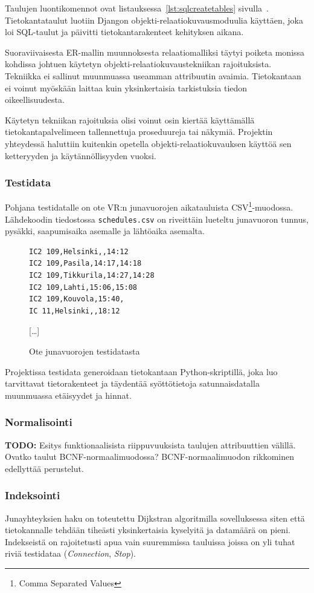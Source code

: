 \documentclass[a4paper,twoside,titlepage,12pt]{article}
\begin{document}
Taulujen luontikomennot ovat listauksessa~\ref{lst:sqlcreatetables} sivulla~\pageref{lst:sqlcreatetables}. Tietokantataulut luotiin Djangon objekti-relaatiokuvausmoduulia käyttäen, joka loi SQL-taulut ja päivitti tietokantarakenteet kehityksen aikana.

Suoraviivaisesta ER-mallin muunnoksesta relaatiomalliksi täytyi poiketa monissa kohdissa johtuen käytetyn objekti-relaatiokuvaustekniikan rajoituksista. Tekniikka ei sallinut muunmuassa useamman attribuutin avaimia. Tietokantaan ei voinut myöskään laittaa kuin yksinkertaisia tarkistuksia tiedon oikeellisuudesta.

Käytetyn tekniikan rajoituksia olisi voinut osin kiertää käyttämällä tietokantapalvelimeen tallennettuja proseduureja tai näkymiä. Projektin yhteydessä haluttiin kuitenkin opetella objekti-relaatiokuvauksen käyttöä sen ketteryyden ja käytännöllisyyden vuoksi.

\subsubsection{Testidata}

Pohjana testidatalle on ote VR:n junavuorojen aikatauluista CSV\footnote{Comma Separated Values}-muodossa. Lähdekoodin tiedostossa \texttt{schedules.csv} on riveittäin lueteltu junavuoron tunnus, pysäkki, saapumisaika asemalle ja lähtöaika asemalta.

\begin{figure}
\begin{lstlisting}
IC2 109,Helsinki,,14:12
IC2 109,Pasila,14:17,14:18
IC2 109,Tikkurila,14:27,14:28
IC2 109,Lahti,15:06,15:08
IC2 109,Kouvola,15:40,
IC 11,Helsinki,,18:12
\end{lstlisting}
[\ldots]
  \caption{Ote junavuorojen testidatasta}
\end{figure}

Projektissa testidata generoidaan tietokantaan Python-skriptillä, joka luo tarvittavat tietorakenteet ja täydentää syöttötietoja satunnaisdatalla muunmuassa etäisyydet ja hinnat.

\subsubsection{Normalisointi}
\textbf{TODO:} Esitys funktionaalisista riippuvuuksista taulujen attribuuttien välillä. Ovatko taulut BCNF-normaalimuodossa? BCNF-normaalimuodon rikkominen edellyttää perustelut.

\subsubsection{Indeksointi}
Junayhteyksien haku on toteutettu Dijkstran algoritmilla sovelluksessa siten että tietokannalle tehdään tiheästi yksinkertaisia kyselyitä ja datamäärä on pieni. Indekseistä on rajoitetusti apua vain suuremmissa tauluissa joissa on yli tuhat riviä testidataa (\emph{Connection}, \emph{Stop}).
\end{document}
